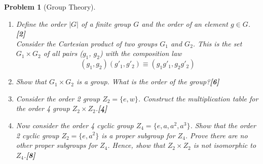 \documentclass[a4paper]{article}
\theoremstyle{new}
\newtheorem{qns}{Problem}[section]
\begin{document}
\newpage
\begin{qns}[Group Theory]\leavevmode
\begin{enumerate}[label=(\roman*)]
\item Define the order $|G|$ of a finite group $G$ and the order of an element $g\in G$.\hfill\textbf{[2]}\\[5pt]
Consider the Cartesian product of two groups $G_1$ and $G_2$. This is the set $G_1\times G_2$ of all pairs ($g_1$, $g_2$) with the composition law
$$(g_1, g_2)(g'_1 , g′_2) ≡ (g_1g′_1, g_2g′_2 )$$
\item Show that $G_1\times G_2$ is a group. What is the order of the group?\hfill\textbf{[6]}
\item Consider the order 2 group $Z_2=\{e,w\}$.  Construct the multiplication table for the order 4 group $Z_2\times Z_2$.\hfill\textbf{[4]}
\item Now consider the order 4 cyclic group $Z_4 =\{e, a, a^2, a^3\}$. Show that the order 2 cyclic group $Z_2=\{e,a^2\}$ is a proper subgroup for $Z_4$. Prove there are no other proper subgroups for $Z_4$. Hence, show that $Z_2\times Z_2$ is not isomorphic to $Z_4$.\hfill\textbf{[8]}
\end{enumerate}
\end{qns}
\end{document}
